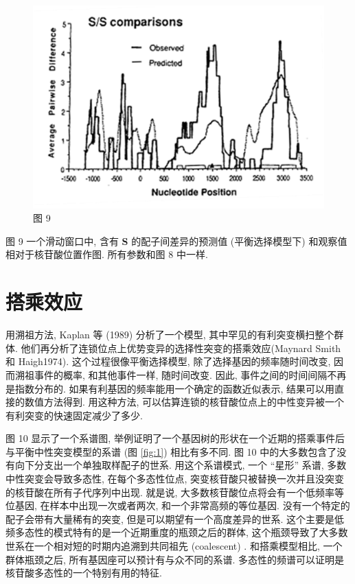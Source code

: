 \documentclass[
    12pt,%
    ]{article}
\begin{document}
\begin{figure}
\centering
\includegraphics{coalescent-process.images/image9.png}
\caption{图 9}
\end{figure}

图 9 一个滑动窗口中, 含有 \textbf{S} 的配子间差异的预测值 (平衡选择模型下) 和观察值相对于核苷酸位置作图. 所有参数和图
8 中一样.

\section{搭乘效应}

用溯祖方法, Kaplan 等 (1989) 分析了一个模型, 其中罕见的有利突变横扫整个群体.
他们再分析了连锁位点上优势变异的选择性突变的搭乘效应(Maynard Smith 和 Haigh1974). 这个过程很像平衡选择模型,
除了选择基因的频率随时间改变, 因而溯祖事件的概率, 和其他事件一样, 随时间改变. 因此, 事件之间的时间间隔不再是指数分布的.
如果有利基因的频率能用一个确定的函数近似表示, 结果可以用直接的数值方法得到. 用这种方法,
可以估算连锁的核苷酸位点上的中性变异被一个有利突变的快速固定减少了多少.

图 10 显示了一个系谱图, 举例证明了一个基因树的形状在一个近期的搭乘事件后与平衡中性突变模型的系谱 (图
\ref{fig:1}) 相比有多不同. 图 10 中的大多数包含了没有向下分支出一个单独取样配子的世系. 用这个系谱模式,
一个 ``星形'' 系谱, 多数中性突变会导致多态性, 在每个多态性位点,
突变核苷酸只被替换一次并且没突变的核苷酸在所有子代序列中出现. 就是说, 大多数核苷酸位点将会有一个低频率等位基因,
在样本中出现一次或者两次, 和一个非常高频的等位基因. 没有一个特定的配子会带有大量稀有的突变,
但是可以期望有一个高度差异的世系. 这个主要是低频多态性的模式特有的是一个近期重度的瓶颈之后的群体,
这个瓶颈导致了大多数世系在一个相对短的时期内追溯到共同祖先 (coalescent) . 和搭乘模型相比, 一个群体瓶颈之后,
所有基因座可以预计有与众不同的系谱. 多态性的频谱可以证明是核苷酸多态性的一个特别有用的特征.
\end{document}
